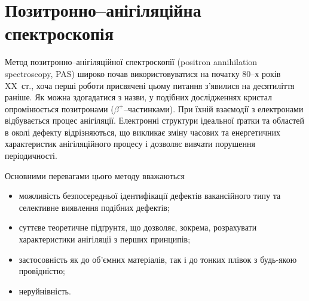 \documentclass[10pt,a5paper,titlepage,oneside]{book}
\numberwithin{equation}{part}
\renewcommand{\theequation}{\thechapter.\arabic{equation}}
\begin{document}








\renewcommand\bibname{Рекомендована та використана література}

\vspace{-5cm}
\setcounter{page}{3}

\clearpage
 \tableofcontents













\chapter{Позитронно--анігіляційна спектроскопія}\label{chapPAS}

Метод позитронно--анігіляційної спектроскопії
(positron annihilation spectroscopy, PAS)
широко почав використовуватися на початку 80--х років XX~ст.,
хоча перші роботи присвячені цьому питання з'явилися на десятиліття раніше.
Як можна здогадатися з назви, у подібних дослідженнях кристал опромінюється позитронами ($\beta^+$--частинками).
При їхній взаємодії з електронами відбувається процес анігіляції.
Електронні структури ідеальної ґратки та областей в околі дефекту
відрізняються, що викликає зміну часових та енергетичних характеристик
анігіляційного процесу і дозволяє вивчати порушення періодичності.


Основними перевагами цього методу вважаються
\begin{itemize}[leftmargin=0em,itemindent=1.5em]
\item можливість безпосередньої ідентифікації дефектів вакансійного типу та
селективне виявлення подібних дефектів;
\item суттєве теоретичне підґрунтя, що дозволяє, зокрема, розрахувати характеристики анігіляції з перших принципів;
\item застосовність як до об'ємних матеріалів, так і до тонких плівок з будь-якою провідністю;
\item неруйнівність.
\end{itemize}
\end{document}
